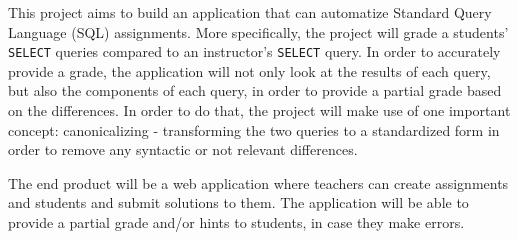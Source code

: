 This project aims to build an application that can automatize Standard Query Language (SQL) assignments. More specifically, the project will grade a students' \texttt{SELECT} queries compared to an instructor's \texttt{SELECT} query. In order to accurately provide a grade, the application will not only look at the results of each query, but also the components of each query, in order to provide a partial grade based on the differences. In order to do that, the project will make use of one important concept: canonicalizing - transforming the two queries to a standardized form in order to remove any syntactic or not relevant differences.

The end product will be a web application where teachers can create assignments and students and submit solutions to them. The application will be able to provide a partial grade and/or hints to students, in case they make errors.